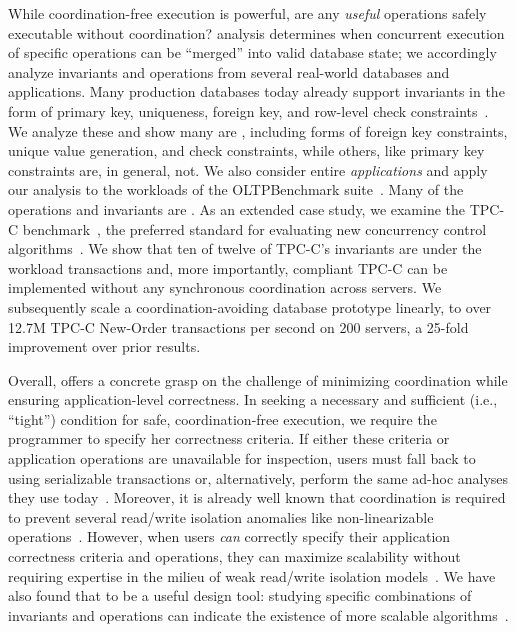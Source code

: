 While coordination-free execution is powerful, are any \textit{useful}
operations safely executable without coordination? \iconfluence
analysis determines when concurrent execution of specific operations
can be ``merged'' into valid database state; we accordingly analyze
invariants and operations from several real-world databases and
applications. Many production databases today already support
invariants in the form of primary key, uniqueness, foreign key, and
row-level check constraints~\cite{kemme-si-ic,hat-vldb}. We analyze
these and show many are \iconfluent, including forms of foreign key
constraints, unique value generation, and check constraints, while
others, like primary key constraints are, in general, not. We also
consider entire \textit{applications} and apply our analysis to the
workloads of the OLTPBenchmark suite~\cite{oltpbench}. Many of the 
operations and invariants are \iconfluent. As an extended case study, we examine the
TPC-C benchmark~\cite{tpcc}, the preferred standard for evaluating new
concurrency control
algorithms~\cite{abadi-vll,jones-dtxn,calvin,hstore,oltpbench}. We
show that ten of twelve of TPC-C's invariants are \iconfluent under
the workload transactions and, more importantly, compliant TPC-C can
be implemented without any synchronous coordination across servers. We
subsequently scale a coordination-avoiding database prototype
linearly, to over 12.7M TPC-C New-Order transactions per second on
$200$ servers, a 25-fold improvement over prior results.


Overall, \iconfluence offers a concrete grasp on the challenge of
minimizing coordination while ensuring application-level correctness. In seeking a necessary and sufficient (i.e., ``tight'')
condition for safe, coordination-free execution, we require the
programmer to specify her correctness criteria. If either these criteria or
application operations are unavailable for inspection, users must fall
back to using serializable transactions or, alternatively, perform the
same ad-hoc analyses they use today~\cite{queue}. Moreover, it is already well
known that coordination is required to prevent several read/write
isolation anomalies like non-linearizable
operations~\cite{gilbert-cap,hat-vldb}. However, when users
\textit{can} correctly specify their application correctness criteria
and operations, they can maximize scalability without requiring
expertise in the milieu of weak read/write isolation
models~\cite{hat-vldb,adya-isolation}. We have also found that
\iconfluence to be a useful design tool: studying specific
combinations of invariants and operations can indicate the existence
of more scalable algorithms~\cite{kohler-commutativity}.

